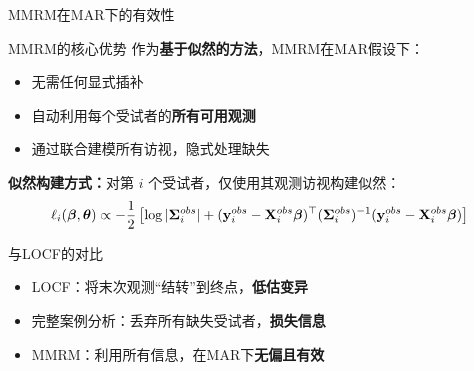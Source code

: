 \documentclass[aspectratio=169,11pt]{beamer}
\newcommand{\by}{\mathbf{y}}
\newcommand{\bX}{\mathbf{X}}
\newcommand{\bbeta}{\boldsymbol{\beta}}
\newcommand{\btheta}{\boldsymbol{\theta}}
\newcommand{\bSigma}{\boldsymbol{\Sigma}}
\begin{document}
\begin{frame}{MMRM在MAR下的有效性}
\begin{block}{MMRM的核心优势}
作为\textbf{基于似然的方法}，MMRM在MAR假设下：
\begin{itemize}
    \item 无需任何显式插补
    \item 自动利用每个受试者的\textbf{所有可用观测}
    \item 通过联合建模所有访视，隐式处理缺失
\end{itemize}
\end{block}

\vspace{0.1cm}
\textbf{似然构建方式：}对第 $i$ 个受试者，仅使用其观测访视构建似然：
\vspace{-0.2cm}
\[
\small
\ell_i(\bbeta, \btheta) \propto -\frac{1}{2} \left[ \log |\bSigma_i^{obs}| + (\by_i^{obs} - \bX_i^{obs}\bbeta)^\top (\bSigma_i^{obs})^{-1} (\by_i^{obs} - \bX_i^{obs}\bbeta) \right]
\]

\vspace{0.1cm}
\begin{exampleblock}{与LOCF的对比}
\begin{itemize}
    \item LOCF：将末次观测``结转''到终点，\textbf{低估变异}
    \item 完整案例分析：丢弃所有缺失受试者，\textbf{损失信息}
    \item MMRM：利用所有信息，在MAR下\textbf{无偏且有效}
\end{itemize}
\end{exampleblock}
\end{frame}
\end{document}
